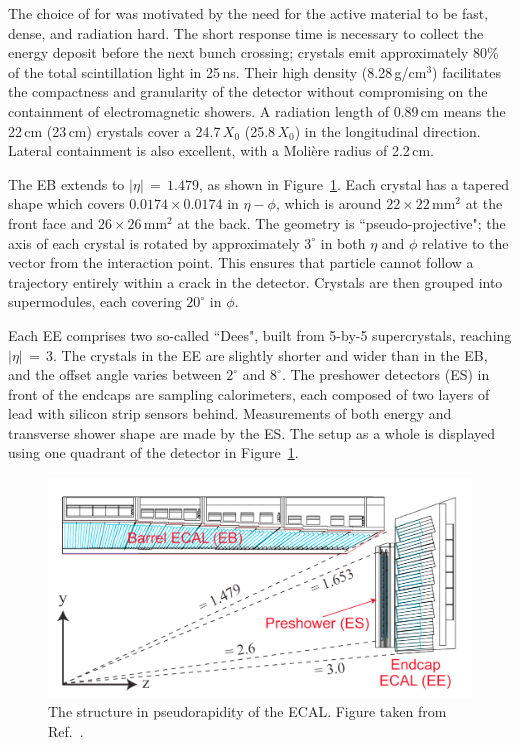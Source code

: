 The choice of \pbw for was motivated by the need for the active material to be fast, dense, and radiation hard.
The short response time is necessary to collect the energy deposit before the next bunch crossing; 
\pbw crystals emit approximately 80\% of the total scintillation light in 25\,ns.
Their high density (8.28\,g/$\textrm{cm}^3$) facilitates the compactness and granularity of the detector without compromising on the containment of electromagnetic showers.
A radiation length of 0.89\,cm means the 22\,cm (23\,cm) crystals cover a 24.7\,$X_0$ (25.8\,$X_0$) in the longitudinal direction. %
Lateral containment is also excellent, with a Moli\`ere radius of 2.2\,cm. %

The EB extends to $|\eta|\,=\,1.479$, as shown in Figure~\ref{fig:detector_ECALquadrant}.
Each crystal has a tapered shape which covers $0.0174\times0.0174$ in $\eta-\phi$, 
which is around $22\times22\,\textrm{mm}^2$ at the front face and $26\times26\,\textrm{mm}^2$ at the back.
The geometry is ``pseudo-projective"; the axis of each crystal is rotated by approximately $3^{\circ}$ in both $\eta$ and $\phi$ relative to the vector from the interaction point.
This ensures that particle cannot follow a trajectory entirely within a crack in the detector.
Crystals are then grouped into supermodules, each covering $20^{\circ}$ in $\phi$.

Each EE comprises two so-called ``Dees", built from 5-by-5 supercrystals, reaching $|\eta|\,=\,3$.
The crystals in the EE are slightly shorter and wider than in the EB, 
and the offset angle varies between $2^{\circ}$ and $8^{\circ}$.
The preshower detectors (ES) in front of the endcaps are sampling calorimeters, 
each composed of two layers of lead with silicon strip sensors behind. %
Measurements of both energy and transverse shower shape are made by the ES.
The setup as a whole is displayed using one quadrant of the detector in Figure~\ref{fig:detector_ECALquadrant}.

\begin{figure}[h!]
  \centering
  \includegraphics[width=\textwidth]{Figures/Detector/ECALquadrant.png}
  \caption[The structure in pseudorapidity of the CMS ECAL.]
  {The structure in pseudorapidity of the ECAL.
  Figure taken from Ref.~\cite{ECALperformance}.}
  \label{fig:detector_ECALquadrant}
\end{figure}

